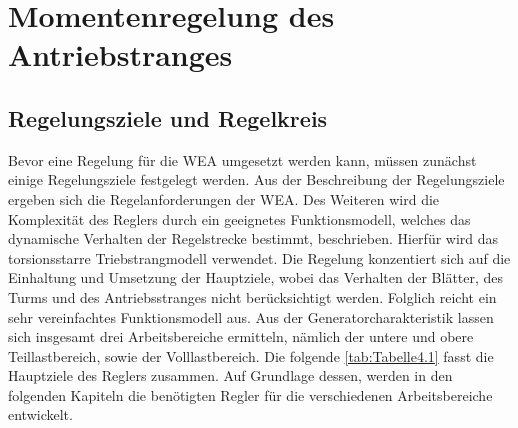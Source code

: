 \section{Momentenregelung des Antriebstranges} \label{regelung}
\subsection{Regelungsziele und Regelkreis} \label{regelziel}
Bevor eine Regelung für die WEA umgesetzt werden kann, müssen zunächst einige Regelungsziele festgelegt werden. Aus der Beschreibung der Regelungsziele ergeben sich die Regelanforderungen der WEA. Des Weiteren wird die Komplexität des Reglers durch ein geeignetes Funktionsmodell, welches das dynamische Verhalten der Regelstrecke bestimmt, beschrieben. Hierfür wird das torsionsstarre Triebstrangmodell verwendet. Die Regelung konzentiert sich auf die Einhaltung und Umsetzung der Hauptziele, wobei das Verhalten der Blätter, des Turms und des Antriebsstranges nicht berücksichtigt werden. Folglich reicht ein sehr vereinfachtes Funktionsmodell aus. Aus der Generatorcharakteristik lassen sich insgesamt drei Arbeitsbereiche ermitteln, nämlich der untere und obere Teillastbereich, sowie der Volllastbereich. Die folgende \autoref{tab:Tabelle4.1} fasst die Hauptziele des Reglers zusammen. Auf Grundlage dessen, werden in den folgenden Kapiteln die benötigten Regler für die verschiedenen Arbeitsbereiche entwickelt.
\\


